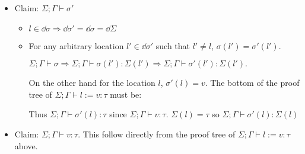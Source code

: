 \begin{enumerate}[(a)]
\begin{enumerate}[i.]
  \begin{itemize}
  \item Claim: $\Sigma;\Gamma \vdash \sigma'$
    \begin{itemize}
    \item $l \in \dd \sigma\Rightarrow \dd \sigma' = \dd \sigma = \dd \Sigma$
    \item For any arbitrary location $l' \in \dd \sigma'$ such that $l' \neq l$, $\sigma(l') = \sigma'(l')$.

    $\Sigma; \Gamma \vdash \sigma \Rightarrow\Sigma;\Gamma \vdash \sigma(l') : \Sigma(l') \Rightarrow \Sigma; \Gamma \vdash \sigma'(l') : \Sigma(l').$

    On the other hand for the location $l$, $\sigma'(l) = v$. The bottom of the proof tree of $\Sigma; \Gamma \vdash l := v : \tau$ must be:


  Thus $\Sigma; \Gamma \vdash \sigma'(l) : \tau$ since $\Sigma; \Gamma \vdash v : \tau$. $\Sigma(l) = \tau$ so $\Sigma; \Gamma \vdash \sigma'(l) : \Sigma(l)$
  \end{itemize}
  \item Claim: $\Sigma;\Gamma \vdash v : \tau$. This follow directly from the proof tree of $\Sigma; \Gamma \vdash l := v : \tau$ above.
  \end{itemize}
\end{enumerate}
\end{enumerate}
